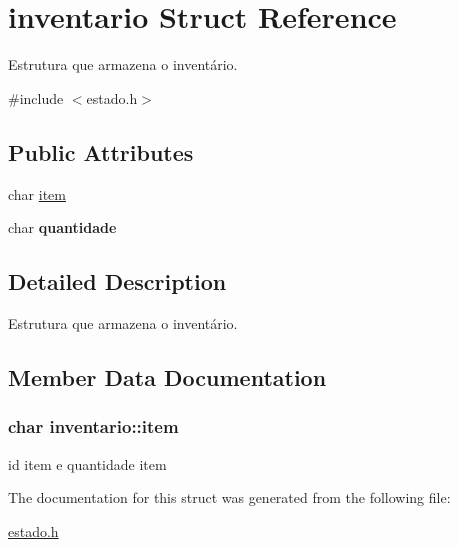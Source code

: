 \hypertarget{structinventario}{}\section{inventario Struct Reference}
\label{structinventario}


Estrutura que armazena o inventário.  




{\ttfamily \#include $<$estado.\+h$>$}

\subsection*{Public Attributes}
\begin{DoxyCompactItemize}
\item 
char \hyperlink{structinventario_a8345ecad0cdab6378e2ace87d4f33168}{item}
\item 
char {\bfseries quantidade}\hypertarget{structinventario_a794a67c0f95cdad847b1b998c08eaa12}{}\label{structinventario_a794a67c0f95cdad847b1b998c08eaa12}

\end{DoxyCompactItemize}


\subsection{Detailed Description}
Estrutura que armazena o inventário. 

\subsection{Member Data Documentation}
\subsubsection[{\texorpdfstring{item}{item}}]{\setlength{\rightskip}{0pt plus 5cm}char inventario\+::item}\hypertarget{structinventario_a8345ecad0cdab6378e2ace87d4f33168}{}\label{structinventario_a8345ecad0cdab6378e2ace87d4f33168}
id item e quantidade item 

The documentation for this struct was generated from the following file\+:\begin{DoxyCompactItemize}
\item 
\hyperlink{estado_8h}{estado.\+h}\end{DoxyCompactItemize}
